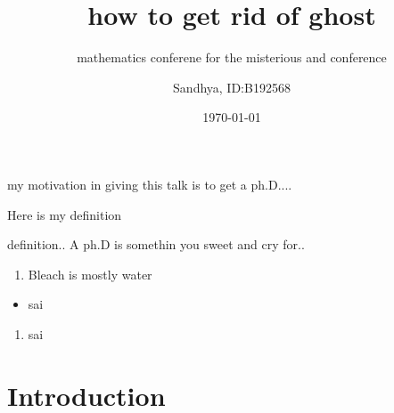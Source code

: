 \documentclass{beamer}
\title{how to get rid of ghost}
\subtitle{mathematics conferene for the misterious and conference}
\author{Sandhya, ID:B192568 }
\date{\today}
\begin{document}
\begin{frame}
    \maketitle
\end{frame}
\begin{frame}
    my motivation in giving this talk is to get a ph.D....
\end{frame}
\begin{frame}[t]
    \vspace{2cm}
    Here is my definition
    \begin{block}{definition..}
    A ph.D is somethin you sweet and cry for..
    \end{block}
\end{frame}
\begin{frame}
    \begin{enumerate}
        \item Bleach is mostly water
    \end{enumerate}
    \begin{itemize}
        \item sai
    \end{itemize}
    \begin{enumerate}
        \item sai
    \end{enumerate}
\end{frame}

    


\section{Introduction}
\end{document}
